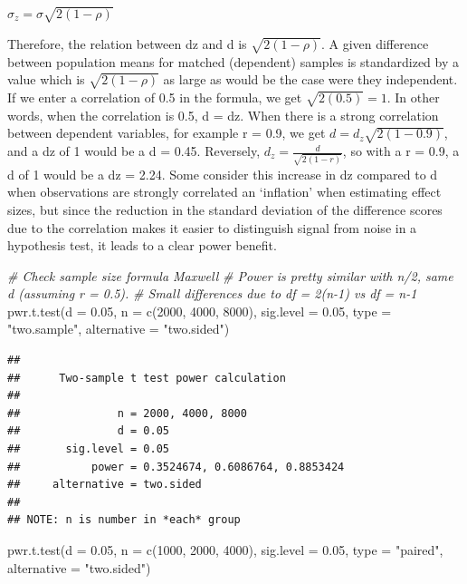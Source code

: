 \documentclass[
]{book}
\newenvironment{Shaded}{\begin{snugshade}}{\end{snugshade}}
\newcommand{\AttributeTok}[1]{\textcolor[rgb]{0.77,0.63,0.00}{#1}}
\newcommand{\CommentTok}[1]{\textcolor[rgb]{0.56,0.35,0.01}{\textit{#1}}}
\newcommand{\DecValTok}[1]{\textcolor[rgb]{0.00,0.00,0.81}{#1}}
\newcommand{\FloatTok}[1]{\textcolor[rgb]{0.00,0.00,0.81}{#1}}
\newcommand{\FunctionTok}[1]{\textcolor[rgb]{0.00,0.00,0.00}{#1}}
\newcommand{\NormalTok}[1]{#1}
\newcommand{\StringTok}[1]{\textcolor[rgb]{0.31,0.60,0.02}{#1}}
\begin{document}
\(\sigma_{z}=\sigma\sqrt{2(1-\rho)}\)

Therefore, the relation between dz and d is \(\sqrt{2(1-\rho)}\). A given difference between population means for matched (dependent) samples is standardized by a value which is \(\sqrt{2(1-\rho)}\) as large as would be the case were they independent. If we enter a correlation of 0.5 in the formula, we get \(\sqrt{2(0.5)}=1\). In other words, when the correlation is 0.5, d = dz. When there is a strong correlation between dependent variables, for example r = 0.9, we get \(d=d_{z}\sqrt{2(1-0.9)}\), and a dz of 1 would be a d = 0.45. Reversely, \(d_{z}=\frac{d}{\sqrt{2(1-r)}}\), so with a r = 0.9, a d of 1 would be a dz = 2.24. Some consider this increase in dz compared to d when observations are strongly correlated an `inflation' when estimating effect sizes, but since the reduction in the standard deviation of the difference scores due to the correlation makes it easier to distinguish signal from noise in a hypothesis test, it leads to a clear power benefit.

\newpage

\begin{Shaded}
\begin{Highlighting}[]
\CommentTok{\# Check sample size formula Maxwell}
\CommentTok{\# Power is pretty similar with n/2, same d (assuming r = 0.5). }
\CommentTok{\# Small differences due to df = 2(n{-}1) vs df = n{-}1}
\FunctionTok{pwr.t.test}\NormalTok{(}\AttributeTok{d =} \FloatTok{0.05}\NormalTok{,}
           \AttributeTok{n =} \FunctionTok{c}\NormalTok{(}\DecValTok{2000}\NormalTok{, }\DecValTok{4000}\NormalTok{, }\DecValTok{8000}\NormalTok{),}
           \AttributeTok{sig.level =} \FloatTok{0.05}\NormalTok{,}
           \AttributeTok{type =} \StringTok{"two.sample"}\NormalTok{,}
           \AttributeTok{alternative =} \StringTok{"two.sided"}\NormalTok{)}
\end{Highlighting}
\end{Shaded}

\begin{verbatim}
## 
##      Two-sample t test power calculation 
## 
##               n = 2000, 4000, 8000
##               d = 0.05
##       sig.level = 0.05
##           power = 0.3524674, 0.6086764, 0.8853424
##     alternative = two.sided
## 
## NOTE: n is number in *each* group
\end{verbatim}

\begin{Shaded}
\begin{Highlighting}[]
\FunctionTok{pwr.t.test}\NormalTok{(}\AttributeTok{d =} \FloatTok{0.05}\NormalTok{,}
           \AttributeTok{n =} \FunctionTok{c}\NormalTok{(}\DecValTok{1000}\NormalTok{, }\DecValTok{2000}\NormalTok{, }\DecValTok{4000}\NormalTok{),}
           \AttributeTok{sig.level =} \FloatTok{0.05}\NormalTok{,}
           \AttributeTok{type =} \StringTok{"paired"}\NormalTok{,}
           \AttributeTok{alternative =} \StringTok{"two.sided"}\NormalTok{)}
\end{Highlighting}
\end{Shaded}
\end{document}
